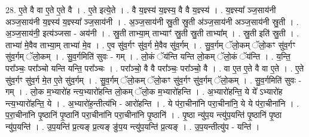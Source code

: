 \documentclass[17pt]{extarticle}
\begin{document}
28. ए॒ते वै वा ए॒ते ए॒ते वै । . ए॒ते इत्ये॒ते । . वै य॒ज्ञ्स्य॑ य॒ज्ञ्स्य॒ वै वै य॒ज्ञ्स्य॑ । . य॒ज्ञ्स्या᳚ ञ्ज॒साय॑नी अञ्ज॒साय॑नी य॒ज्ञ्स्य॑ य॒ज्ञ्स्या᳚ ञ्ज॒साय॑नी । . अ॒ञ्ज॒साय॑नी स्रु॒ती स्रु॒ती अ॑ञ्ज॒साय॑नी अञ्ज॒साय॑नी स्रु॒ती । . अ॒ञ्ज॒साय॑नी॒ इत्य॑ञ्जसा - अय॑नी । . स्रु॒ती ताभ्या॒म् ताभ्याꣳ॑ स्रु॒ती स्रु॒ती ताभ्या᳚म् । . स्रु॒ती इति॑ स्रु॒ती । . ताभ्या॑ मे॒वैव ताभ्या॒म् ताभ्या॑ मे॒व । . ए॒व सु॑व॒र्गꣳ सु॑व॒र्ग मे॒वैव सु॑व॒र्गम् । . सु॒व॒र्गम् ॅलो॒कम् ॅलो॒कꣳ सु॑व॒र्गꣳ सु॑व॒र्गम् ॅलो॒कम् । . सु॒व॒र्गमिति॑ सुवः - गम् । . लो॒कं ॅय॑न्ति यन्ति लो॒कम् ॅलो॒कं ॅय॑न्ति । . य॒न्ति॒ परा᳚ञ्चः॒ परा᳚ञ्चो यन्ति यन्ति॒ परा᳚ञ्चः । . परा᳚ञ्चो॒ वै वै परा᳚ञ्चः॒ परा᳚ञ्चो॒ वै । . वा ए॒त ए॒ते वै वा ए॒ते । . ए॒ते सु॑व॒र्गꣳ सु॑व॒र्ग मे॒त ए॒ते सु॑व॒र्गम् । . सु॒व॒र्गम् ॅलो॒कम् ॅलो॒कꣳ सु॑व॒र्गꣳ सु॑व॒र्गम् ॅलो॒कम् । . सु॒व॒र्गमिति॑ सुवः - गम् । . लो॒क म॒भ्यारो॑ह न्त्य॒भ्यारो॑हन्ति लो॒कम् ॅलो॒क म॒भ्यारो॑हन्ति । . अ॒भ्यारो॑हन्ति॒ ये ये᳚ ऽभ्यारो॑ह न्त्य॒भ्यारो॑हन्ति॒ ये । . अ॒भ्यारो॑ह॒न्तीत्य॑भि - आरो॑हन्ति । . ये प॑रा॒चीना॑नि परा॒चीना॑नि॒ ये ये प॑रा॒चीना॑नि । . प॒रा॒चीना॑नि पृ॒ष्ठानि॑ पृ॒ष्ठानि॑ परा॒चीना॑नि परा॒चीना॑नि पृ॒ष्ठानि॑ । . पृ॒ष्ठा न्यु॑प॒य न्त्यु॑प॒यन्ति॑ पृ॒ष्ठानि॑ पृ॒ष्ठा न्यु॑प॒यन्ति॑ । . उ॒प॒यन्ति॑ प्र॒त्यङ् प्र॒त्यङ् ङु॑प॒य न्त्यु॑प॒यन्ति॑ प्र॒त्यङ् । . उ॒प॒यन्तीत्यु॑प - यन्ति॑ । \newline
\end{document}
